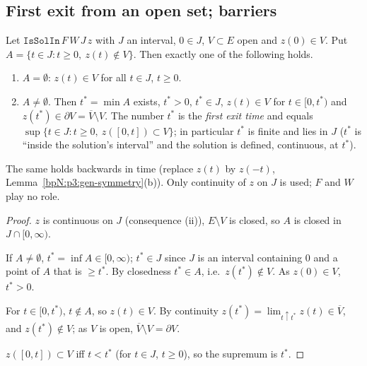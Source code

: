 \subsection{First exit from an open set; barriers}\label{bpN:p3:s-exit}

\begin{lemma}\label{bpN:p3:gen-exit}
Let $\texttt{IsSolIn}\,F\,W\,J\,z$ with $J$ an interval, $0\in J$, $V\subset E$ open and $z(0)\in V$. Put
$A=\{t\in J:t\ge0,\ z(t)\notin V\}$. Then exactly one of the following holds.
\begin{enumerate}[label=(\roman*)]
\item $A=\emptyset$: $z(t)\in V$ for all $t\in J$, $t\ge0$.
\item $A\ne\emptyset$. Then $t^*=\min A$ exists, $t^*>0$, $t^*\in J$, $z(t)\in V$ for $t\in[0,t^*)$ and
  $z(t^*)\in\partial V=\overline V\setminus V$. The number $t^*$ is the \emph{first exit time} and equals
  $\sup\{t\in J:t\ge0,\ z([0,t])\subset V\}$; in particular $t^*$ is finite and lies in $J$ ($t^*$ is ``inside the
  solution's interval'' and the solution is defined, continuous, at $t^*$).
\end{enumerate}
The same holds backwards in time (replace $z(t)$ by $z(-t)$, Lemma~\ref{bpN:p3:gen-symmetry}(b)).
Only continuity of $z$ on $J$ is used; $F$ and $W$ play no role.
\end{lemma}
\begin{proof}
\label{stepN:p3:exit-closed} $z$ is continuous on $J$ (consequence (ii)), $E\setminus V$ is closed, so $A$ is closed in $J\cap[0,\infty)$.

\label{stepN:p3:exit-min} If $A\ne\emptyset$, $t^*=\inf A\in[0,\infty)$; $t^*\in J$ since $J$ is an interval containing $0$ and a point of $A$ that is $\ge t^*$. By closedness $t^*\in A$, i.e.\ $z(t^*)\notin V$. As $z(0)\in V$, $t^*>0$.

\label{stepN:p3:exit-bdry} For $t\in[0,t^*)$, $t\notin A$, so $z(t)\in V$. By continuity $z(t^*)=\lim_{t\uparrow t^*}z(t)\in\overline V$, and $z(t^*)\notin V$; as $V$ is open, $\overline V\setminus V=\partial V$.

\label{stepN:p3:exit-sup} $z([0,t])\subset V$ iff $t<t^*$ (for $t\in J$, $t\ge 0$), so the supremum is $t^*$.
\end{proof}

